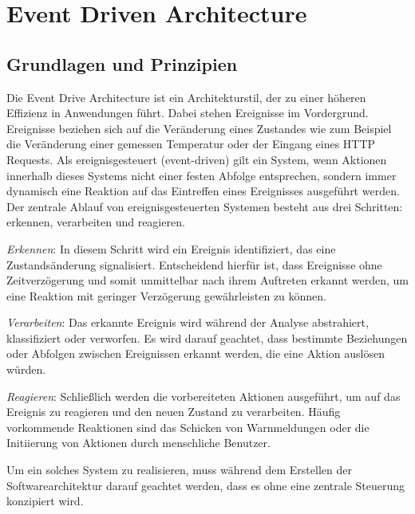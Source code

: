 \documentclass[a4paper,12pt]{article}
\let\stdsection\section
\renewcommand\section{\newpage\stdsection}
\begin{document}
\section{Event Driven Architecture}
\subsection{Grundlagen und Prinzipien}
Die Event Drive Architecture ist ein Architekturstil, der zu einer höheren Effizienz in Anwendungen führt. Dabei stehen Ereignisse im Vordergrund. Ereignisse beziehen sich auf die Veränderung eines Zustandes wie zum Beispiel die Veränderung einer gemessen Temperatur oder der Eingang eines HTTP Requests.
Als ereignisgesteuert (event-driven) gilt ein System, wenn Aktionen innerhalb dieses Systems nicht einer festen Abfolge entsprechen, sondern immer dynamisch eine Reaktion auf das Eintreffen eines Ereignisses ausgeführt werden.
Der zentrale Ablauf von ereignisgesteuerten Systemen besteht aus drei Schritten: erkennen, verarbeiten und reagieren. \cite[S. 48f]{Bruns2010}

\textit{Erkennen}: In diesem Schritt wird ein Ereignis identifiziert, das eine Zustandsänderung signalisiert. Entscheidend hierfür ist, dass Ereignisse ohne Zeitverzögerung und somit unmittelbar nach ihrem Auftreten erkannt werden, um eine Reaktion mit geringer Verzögerung gewährleisten zu können.

\textit{Verarbeiten}: Das erkannte Ereignis wird während der Analyse abstrahiert, klassifiziert oder verworfen. Es wird darauf geachtet, dass bestimmte Beziehungen oder Abfolgen zwischen Ereignissen erkannt werden, die eine Aktion auslösen würden.

\textit{Reagieren}: Schließlich werden die vorbereiteten Aktionen ausgeführt, um auf das Ereignis zu reagieren und den neuen Zustand zu verarbeiten. Häufig vorkommende Reaktionen sind das Schicken von Warnmeldungen oder die Initiierung von Aktionen durch menschliche Benutzer. 

Um ein solches System zu realisieren, muss während dem Erstellen der Softwarearchitektur darauf geachtet werden, dass es ohne eine zentrale Steuerung konzipiert wird. \cite[S. 50]{Bruns2010}
\end{document}
